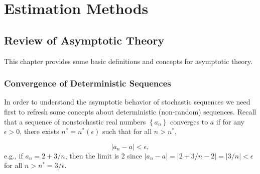 \documentclass[english,12pt]{book}\usepackage[]{graphicx}\usepackage[]{xcolor}
\begin{document}
\part{Estimation Methods}


\chapter{Review of Asymptotic Theory}

This chapter provides some basic definitions and concepts for asymptotic theory. 

\section{Convergence of Deterministic Sequences}\label{sec:nonstochastic_con}

In order to understand the asymptotic behavior of stochastic sequences we need first to refresh some concepts about deterministic (non-random) sequences. Recall that a sequence of nonstochastic real numbers $\left\lbrace a_n\right\rbrace$ converges to $a$ if for any $\epsilon > 0$, there exists $n^* = n^*(\epsilon)$ such that for all $n > n^*$,

\begin{equation*}
	\left| a_n - a\right|<\epsilon, 
\end{equation*}
%
e.g., if $a_n = 2 + 3/n$, then the limit is 2 since $\left| a_n - a\right| =\left| 2 + 3/n - 2\right| = \left|3/n\right|< \epsilon$ for all $n > n^* = 3/\epsilon$. 
\end{document}

